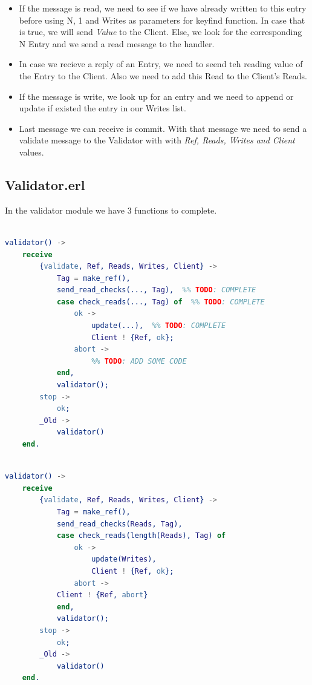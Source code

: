 \documentclass[a4paper, 10pt]{article}
\begin{document}
\begin{itemize}
  \item If the message is read, we need to see if we have already written to this entry before using N, 1 and Writes as parameters for keyfind function. In case that is true, we will send \textit{Value} to the Client. Else, we look for the corresponding N Entry and we send a read message to the handler.
  \item In case we recieve a reply of an Entry, we need to seend teh reading value of the Entry to the Client. Also we need to add this Read to the Client's Reads.
  \item If the message is write, we look up for an entry and we need to append or update if existed the entry in our Writes list.
  \item Last message we can receive is commit. With that message we need to send a validate message to the Validator with with \textit{Ref, Reads, Writes and Client} values.
\end{itemize}

\clearpage
\subsection{Validator.erl}

In the validator module we have 3 functions to complete. 

\begin{minipage}{.45\textwidth}
	\begin{lstlisting}[language=erlang, caption={Template}]

validator() ->
    receive
        {validate, Ref, Reads, Writes, Client} ->
            Tag = make_ref(),
            send_read_checks(..., Tag),  %% TODO: COMPLETE
            case check_reads(..., Tag) of  %% TODO: COMPLETE
                ok ->
                    update(...),  %% TODO: COMPLETE
                    Client ! {Ref, ok};
                abort ->
                    %% TODO: ADD SOME CODE
            end,
            validator();
        stop ->
            ok;
        _Old ->
            validator()
    end.
 	\end{lstlisting}
    \end{minipage}\hfill
    \begin{minipage}{.45\textwidth}
	\begin{lstlisting}[language=erlang, caption={Filled version}]

validator() ->
    receive
        {validate, Ref, Reads, Writes, Client} ->
            Tag = make_ref(),
            send_read_checks(Reads, Tag),  
            case check_reads(length(Reads), Tag) of  
                ok ->
                    update(Writes),
                    Client ! {Ref, ok};
                abort ->
		    Client ! {Ref, abort}
            end,
            validator();
        stop ->
            ok;
        _Old ->
            validator()
    end.
  	\end{lstlisting}
  \end{minipage}
\end{document}
